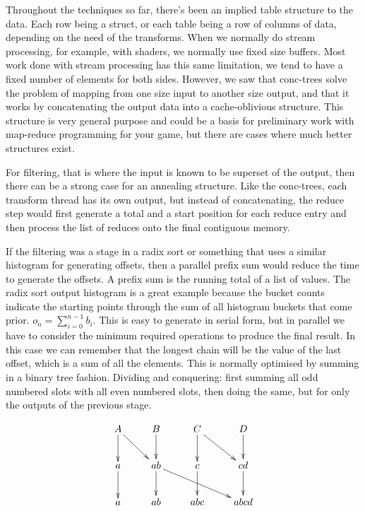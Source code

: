 Throughout the techniques so far, there's been an implied table structure to
the data. Each row being a struct, or each table being a row of columns of
data, depending on the need of the transforms. When we normally do stream
processing, for example, with shaders, we normally use fixed size buffers. Most
work done with stream processing has this same limitation, we tend to have a
fixed number of elements for both sides. However, we saw that conc-trees solve
the problem of mapping from one size input to another size output, and that it
works by concatenating the output data into a cache-oblivious structure. This
structure is very general purpose and could be a basis for preliminary work
with map-reduce programming for your game, but there are cases where much
better structures exist.

For filtering, that is where the input is known to be superset of the output,
then there can be a strong case for an annealing structure. Like the
conc-trees, each transform thread has its own output, but instead of
concatenating, the reduce step would first generate a total and a start
position for each reduce entry and then process the list of reduces onto the
final contiguous memory.

If the filtering was a stage in a radix sort or something that uses a similar
histogram for generating offsets, then a parallel prefix sum would reduce the
time to generate the offsets. A prefix sum is the running total of a list of
values. The radix sort output histogram is a great example because the bucket
counts indicate the starting points through the sum of all histogram buckets
that come prior. $o_n = \sum_{i=0}^{n-1} b_i$. This is easy to generate in
serial form, but in parallel we have to consider the minimum required
operations to produce the final result. In this case we can remember that the
longest chain will be the value of the last offset, which is a sum of all the
elements. This is normally optimised by summing in a binary tree fashion.
Dividing and conquering: first summing all odd numbered slots with all even
numbered slots, then doing the same, but for only the outputs of the previous
stage.

\begin{displaymath}
	\xymatrix{
	A \ar[d] \ar[dr] & B \ar[d] & C \ar[d] \ar[dr] & D \ar[d] \\
	a \ar[d] & ab \ar[d] \ar[drr] & c \ar[d] & cd \ar[d] \\
	a & ab & abc & abcd }
\end{displaymath}

